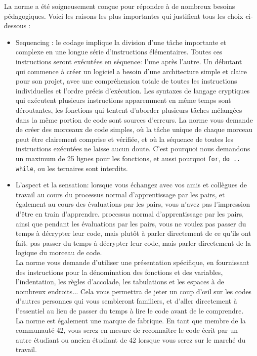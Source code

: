 \documentclass{42-fr}
\begin{document}
    La norme a été soigneusement conçue pour répondre à de nombreux besoins pédagogiques. 
    Voici les raisons les plus importantes qui justifient tous les choix ci-dessous :
    \begin{itemize}

    \item Sequencing : le codage implique la division d'une tâche importante et complexe en une
    longue série d'instructions élémentaires. 
    Toutes ces instructions seront exécutées en séquence: l'une après l'autre. 
    Un débutant qui commence à créer un logiciel a besoin d'une architecture simple et claire pour son projet, 
    avec une compréhension totale de toutes les instructions individuelles et l'ordre précis d'exécution. 
    Les syntaxes de langage cryptiques qui exécutent plusieurs instructions apparemment en même temps sont déroutantes, les fonctions qui tentent d'aborder plusieurs tâches mélangées dans la même portion de code sont sources d'erreurs.
    La norme vous demande de créer des morceaux de code simples, où la tâche unique de chaque morceau peut être clairement comprise et vérifiée, et où la séquence de toutes les instructions exécutées ne laisse aucun doute. 
    C'est pourquoi nous demandons un maximum de 25 lignes pour les fonctions, et aussi pourquoi
    \texttt{for}, \texttt{do .. while}, ou les ternaires sont interdits.

    \item L'aspect et la sensation: lorsque vous échangez avec vos amis et collègues de travail au cours du processus normal d'apprentissage par les pairs, et également au cours des évaluations par les pairs, vous n'avez pas l'impression d'être en train d'apprendre. processus normal d'apprentissage par les pairs, ainsi que pendant les évaluations par les pairs, vous ne voulez pas passer du temps à décrypter leur code, mais plutôt à parler directement de ce qu'ils ont fait. pas passer du temps à décrypter leur code, mais parler directement de la logique du morceau de code. \\
    La norme vous demande d'utiliser une présentation spécifique, en fournissant des instructions pour la dénomination des fonctions et des variables, l'indentation, les règles d'accolade, les tabulations et les espaces à de nombreux endroits...    
    Cela vous permettra de jeter un coup d'œil sur les codes d'autres personnes qui vous sembleront familiers, et d'aller directement à l'essentiel au lieu de passer du temps à lire le code avant de le comprendre.
    La norme est également une marque de fabrique. En tant que membre de la communauté 42, vous serez en mesure de reconnaître le code écrit par un autre étudiant ou ancien étudiant de 42 lorsque vous serez sur le marché du travail.


\end{itemize}
\end{document}
